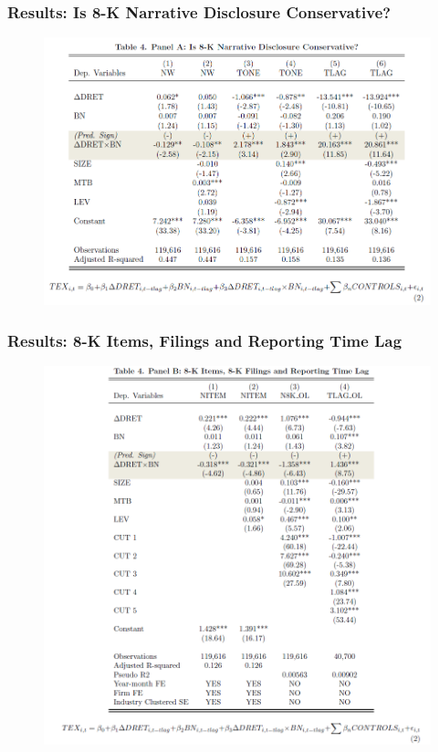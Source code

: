 \documentclass{beamer}
\begin{document}
\begin{frame}
\frametitle{Results: Is 8-K Narrative Disclosure Conservative?}
	\begin{figure}[h]
	\centering
	\includegraphics[width=0.7\linewidth]{tab4panA}
	\label{tab4panA}
	\end{figure}
\end{frame}
\begin{frame}
\frametitle{Results: 8-K Items, Filings and Reporting Time Lag}
	\begin{figure}[h]
	\centering
	\includegraphics[width=0.65\linewidth]{tab4panB}
	\label{tab4panB}
	\end{figure}
\end{frame}
\end{document}
